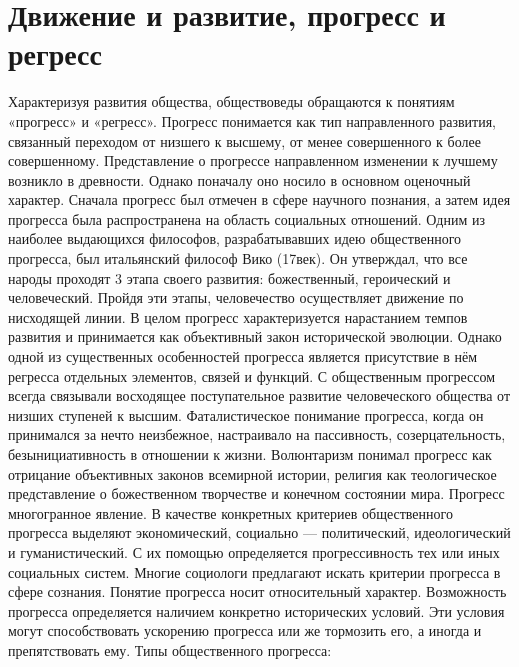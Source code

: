 \documentclass[12pt]{article}
\begin{document}
\section{Движение и развитие, прогресс и регресс}
Характеризуя  развития общества, обществоведы обращаются к понятиям «прогресс» и «регресс». Прогресс
понимается  как  тип  направленного  развития,  связанный  переходом  от  низшего  к  высшему,   от  менее
совершенного  к  более  совершенному.  Представление  о  прогрессе   направленном   изменении  к  лучшему
возникло в древности. Однако поначалу оно носило в основном оценочный характер. Сначала прогресс был
отмечен в сфере научного познания, а затем идея  прогресса была распространена на область социальных
отношений. Одним из наиболее выдающихся  философов, разрабатывавших идею общественного прогресса,
был итальянский философ  Вико (17век). Он утверждал, что все народы проходят 3 этапа своего развития:
божественный,  героический и человеческий. Пройдя эти этапы, человечество осуществляет движение  по
нисходящей  линии.  В  целом  прогресс  характеризуется  нарастанием  темпов  развития   и  принимается  как
объективный закон исторической эволюции. Однако одной из существенных особенностей прогресса является
присутствие в нём регресса отдельных элементов, связей  и функций. С общественным прогрессом всегда
связывали  восходящее  поступательное  развитие   человеческого  общества  от  низших  ступеней  к  высшим.
Фаталистическое  понимание  прогресса,   когда  он  принимался  за  нечто  неизбежное,  настраивало  на
пассивность, созерцательность, безынициативность в отношении к жизни. Волюнтаризм понимал прогресс как
отрицание   объективных  законов  всемирной  истории,  религия   как  теологическое  представление  о
божественном  творчестве  и  конечном  состоянии  мира.  Прогресс   многогранное  явление.   В  качестве
конкретных  критериев  общественного  прогресса  выделяют  экономический,  социально   ---  политический,
идеологический и гуманистический. С их помощью определяется прогрессивность тех или иных социальных  
систем. Многие социологи предлагают искать критерии прогресса в сфере сознания. Понятие прогресса носит
относительный характер. Возможность прогресса  определяется наличием конкретно  исторических условий.
Эти условия могут способствовать ускорению прогресса или же тормозить его, а иногда и препятствовать ему.
Типы общественного прогресса:
\end{document}

